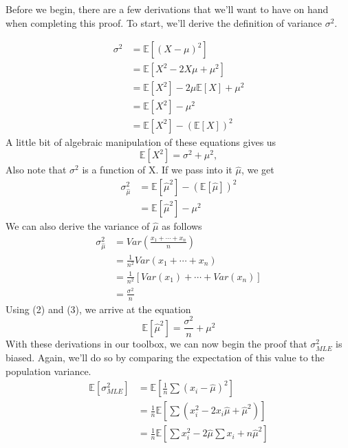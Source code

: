 \documentclass[11pt,largemargins]{homework}
\begin{document}
\begin{alphaparts}
	Before we begin, there are a few derivations that we'll want to have on hand when completing this proof. To start, we'll derive the definition of variance $\sigma^2$.
	
	\begin{align*}
		\sigma^2&=\mathbb{E}\left[ {(X-\mu)}^2\right]\\
		&= \mathbb{E}[X^2-2X\mu+\mu^2]\\
		&= \mathbb{E}[X^2]-2\mu\mathbb{E}[X]+\mu^2\\
		&= \mathbb{E}[X^2]-\mu^2\\
		&= \mathbb{E}[X^2]-{(\mathbb{E}[X])}^2
	\end{align*}
	A little bit of algebraic manipulation of these equations gives us 
	\begin{equation}
		\mathbb{E}{[X^2]}=\sigma^2+\mu^2,
	\end{equation}
	Also note that $\sigma^2$ is a function of X. If we pass into it $\hat{\mu}$, we get
	\begin{align}
		\sigma_{\hat{\mu}}^2&=\mathbb{E}[\hat{\mu}^2]-{(\mathbb{E}[\hat{\mu}])}^2 \nonumber\\
		&=\mathbb{E}[\hat{\mu}^2]-{\mu}^2  
	\end{align}
	We can also derive the variance of $\hat{\mu}$ as follows
	\begin{align}
		\sigma_{\hat{\mu}}^2 &= Var(\frac{x_1+\cdots+x_n}{n}) \nonumber\\
		&=\frac{1}{n^2}Var(x_1+\cdots+x_n)\nonumber\\
		&=\frac{1}{n^2}[Var(x_1)+\cdots+Var(x_n)]\nonumber\\
		&=\frac{\sigma^2}{n}
	\end{align}
	Using (2) and (3), we arrive at the equation
	\begin{equation}
		\mathbb{E}\left[ \hat{\mu}^2\right]=\frac{\sigma^2}{n}+\mu^2
	\end{equation}
	With these derivations in our toolbox, we can now begin the proof that $\sigma^2_{MLE}$ is biased. Again, we'll do so by comparing the expectation of this value to the population variance.
	\begin{align}
		\mathbb{E}\left[ \sigma^2_{MLE}\right] &= \mathbb{E}\left[ \frac{1}{n}\sum{(x_i-\hat{\mu})}^2\right] \nonumber\\
		&= \frac{1}{n}\mathbb{E}\left[ \sum\left( x_i^2-2x_i\hat{\mu}+\hat{\mu}^2\right)\right]\nonumber\\
		&= \frac{1}{n}\mathbb{E}\left[ \sum x_i^2 -2\hat{\mu}\sum x_i+n\hat{\mu}^2\right]\nonumber\\

\end{align}
\end{alphaparts}
\end{document}
